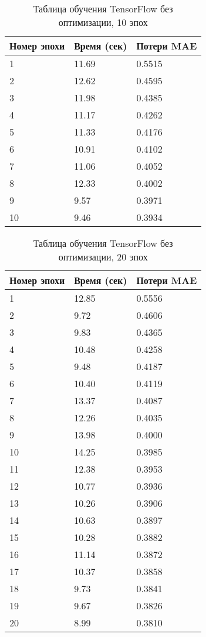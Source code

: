 \documentclass[a4paper,12pt,titlepage,final]{article}
\begin{document}
\begin{table}[H]
\centering
\begin{tabular}{|p{5.4cm}|p{3.8cm}|p{3.8cm}|}
\hline
Номер эпохи & Время (сек) & Потери MAE\\
\hline
1 & 11.69 & 0.5515 \\ [1.5ex]
\hline
2 & 12.62 & 0.4595 \\ [1.5ex]
\hline
3 & 11.98 & 0.4385 \\ [1.5ex]
\hline
4 & 11.17 & 0.4262 \\ [1.5ex]
\hline
5 & 11.33 & 0.4176 \\ [1.5ex]
\hline
6 & 10.91 & 0.4102 \\ [1.5ex]
\hline
7 & 11.06 & 0.4052 \\ [1.5ex]
\hline
8 & 12.33 & 0.4002 \\ [1.5ex]
\hline
9 & 9.57 & 0.3971 \\ [1.5ex]
\hline
10 & 9.46 & 0.3934 \\ [1.5ex]
\hline
\end{tabular}
\caption{Таблица обучения TensorFlow без оптимизации, 10 эпох}
\label{table1}
\end{table}

\begin{table}[H]
\centering
\begin{tabular}{|p{6.4cm}|p{3.2cm}|p{3.2cm}|}
\hline
Номер эпохи & Время (сек) & Потери MAE\\
\hline
1 & 12.85 & 0.5556 \\ [1.5ex]
\hline
2 & 9.72 & 0.4606 \\ [1.5ex]
\hline
3 & 9.83 & 0.4365 \\ [1.5ex]
\hline
4 & 10.48 & 0.4258 \\ [1.5ex]
\hline
5 & 9.48 & 0.4187 \\ [1.5ex]
\hline
6 & 10.40 & 0.4119 \\ [1.5ex]
\hline
7 & 13.37 & 0.4087 \\ [1.5ex]
\hline
8 & 12.26 & 0.4035 \\ [1.5ex]
\hline
9 & 13.98 & 0.4000 \\ [1.5ex]
\hline
10 & 14.25 & 0.3985 \\ [1.5ex]
\hline
11 & 12.38 & 0.3953 \\ [1.5ex]
\hline
12 & 10.77 & 0.3936 \\ [1.5ex]
\hline
13 & 10.26 & 0.3906 \\ [1.5ex]
\hline
14 & 10.63 & 0.3897 \\ [1.5ex]
\hline
15 & 10.28 & 0.3882 \\ [1.5ex]
\hline
16 & 11.14 & 0.3872 \\ [1.5ex]
\hline
17 & 10.37 & 0.3858 \\ [1.5ex]
\hline
18 & 9.73 & 0.3841 \\ [1.5ex]
\hline
19 & 9.67 & 0.3826 \\ [1.5ex]
\hline
20 & 8.99 & 0.3810 \\ [1.5ex]
\hline
\end{tabular}
\caption{Таблица обучения TensorFlow без оптимизации, 20 эпох}
\label{table2}
\end{table}
\end{document}
